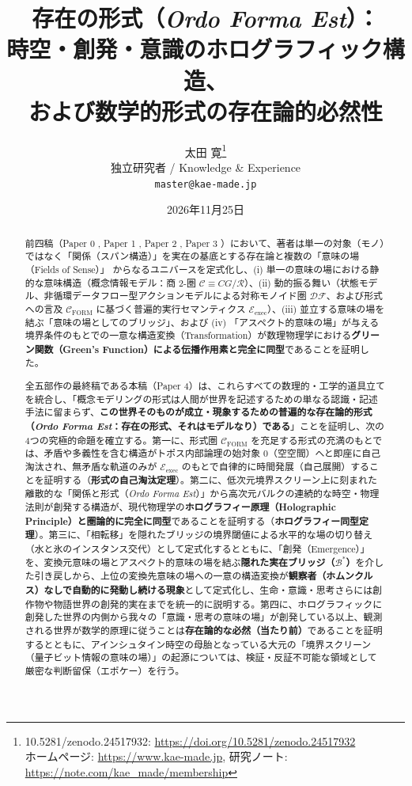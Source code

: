 \documentclass[11pt,a4paper]{ltjsarticle}
\title{\textbf{存在の形式（\textit{Ordo Forma Est}）：}\\
\Large 時空・創発・意識のホログラフィック構造、\\
および数学的形式の存在論的必然性}
\author{太田 寛\thanks{10.5281/zenodo.24517932: \url{https://doi.org/10.5281/zenodo.24517932} \\ ホームページ: \url{https://www.kae-made.jp}, 研究ノート: \url{https://note.com/kae_made/membership}}\\
\small 独立研究者 / Knowledge \& Experience\\
\small \texttt{master@kae-made.jp}}
\date{2026年11月25日}
\theoremstyle{definition}
\theoremstyle{plain}
\begin{document}
\maketitle

\begin{abstract}
前四稿（Paper 0 \cite{Ota2026_0}, Paper 1 \cite{Ota2026_1}, Paper 2 \cite{Ota2026_2}, Paper 3 \cite{Ota2026_3}）において、著者は単一の対象（モノ）ではなく「関係（スパン構造）」を実在の基底とする存在論と複数の「意味の場（Fields of Sense）」\cite{Gabriel2015} からなるユニバースを定式化し、(i) 単一の意味の場における静的な意味構造（概念情報モデル：商 2-圏 $\mathcal{C} \equiv CG/\mathcal{R}$）、(ii) 動的振る舞い（状態モデル、非循環データフロー型アクションモデルによる対称モノイド圏 $\mathcal{DF}$、および形式への言及 $\mathcal{C}_{\mathrm{FORM}}$ に基づく普遍的実行セマンティクス $\mathcal{E}_{\mathrm{exec}}$）、(iii) 並立する意味の場を結ぶ「意味の場としてのブリッジ」、および (iv) 「アスペクト的意味の場」が与える境界条件のもとでの一意な構造変換（Transformation）が数理物理学における\textbf{グリーン関数（Green's Function）による伝播作用素と完全に同型}であることを証明した。

全五部作の最終稿である本稿（Paper 4）は、これらすべての数理的・工学的道具立てを統合し、「概念モデリングの形式は人間が世界を記述するための単なる認識・記述手法に留まらず、\textbf{この世界そのものが成立・現象するための普遍的な存在論的形式（\textit{Ordo Forma Est}：存在の形式、それはモデルなり）である}」ことを証明し、次の4つの究極的命題を確立する。第一に、形式圏 $\mathcal{C}_{\mathrm{FORM}}$ を充足する形式の充満のもとでは、矛盾や多義性を含む構造がトポス内部論理の始対象 $0$（空空間）へと即座に自己淘汰され、無矛盾な軌道のみが $\mathcal{E}_{\mathrm{exec}}$ のもとで自律的に時間発展（自己展開）することを証明する（\textbf{形式の自己淘汰定理}）。第二に、低次元境界スクリーン上に刻まれた離散的な「関係と形式（\textit{Ordo Forma Est}）」から高次元バルクの連続的な時空・物理法則が創発する構造が、現代物理学の\textbf{ホログラフィー原理（Holographic Principle）と圏論的に完全に同型}であることを証明する（\textbf{ホログラフィー同型定理}）。第三に、「相転移」を隠れたブリッジの境界閾値による水平的な場の切り替え（水と氷のインスタンス交代）として定式化するとともに、「創発（Emergence）」を、変換元意味の場とアスペクト的意味の場を結ぶ\textbf{隠れた実在ブリッジ（$\mathcal{B}^*$）}を介した引き戻しから、上位の変換先意味の場への一意の構造変換が\textbf{観察者（ホムンクルス）なしで自動的に発動し続ける現象}として定式化し、生命・意識・思考さらには創作物や物語世界の創発的実在までを統一的に説明する。第四に、ホログラフィックに創発した世界の内側から我々の「意識・思考の意味の場」が創発している以上、観測される世界が数学的原理に従うことは\textbf{存在論的な必然（当たり前）}であることを証明するとともに、アインシュタイン時空の母胎となっている大元の「境界スクリーン（量子ビット情報の意味の場）」の起源については、検証・反証不可能な領域として厳密な判断留保（エポケー）を行う。
\end{abstract}
\end{document}
